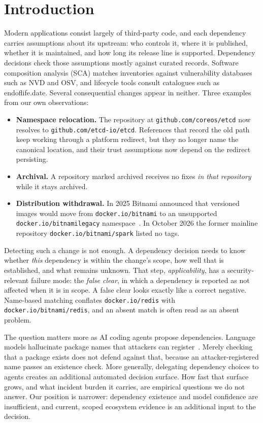 \documentclass[11pt,a4paper]{article}
\newcommand{\code}[1]{\texttt{#1}}
\begin{document}
\section{Introduction}
\label{sec:intro}

Modern applications consist largely of third-party code, and each
dependency carries assumptions about its upstream: who controls it,
where it is published, whether it is maintained, and how long its
release line is supported. Dependency decisions check those
assumptions mostly against curated records. Software composition
analysis (SCA) matches inventories against vulnerability databases
such as NVD and OSV, and lifecycle tools consult catalogues such as
endoflife.date. Several consequential changes appear in neither. Three
examples from our own observations:
\begin{itemize}[leftmargin=*]
  \item \textbf{Namespace relocation.} The repository at
    \code{github.com/coreos/etcd} now resolves to
    \code{github.com/etcd-io/etcd}. References that record the old
    path keep working through a platform redirect, but they no longer
    name the canonical location, and their trust assumptions now
    depend on the redirect persisting.
  \item \textbf{Archival.} A repository marked archived receives no
    fixes \emph{in that repository} while it stays archived.
  \item \textbf{Distribution withdrawal.} In 2025 Bitnami announced
    that versioned images would move from \code{docker.io/bitnami} to
    an unsupported \code{docker.io/bitnamilegacy}
    namespace~\cite{bitnami2025catalog}. In October 2026 the former
    mainline repository \code{docker.io/bitnami/spark} listed no tags.
\end{itemize}

Detecting such a change is not enough. A dependency decision needs to
know whether \emph{this} dependency is within the change's scope, how
well that is established, and what remains unknown. That step,
\emph{applicability}, has a security-relevant failure mode: the
\emph{false clear}, in which a dependency is reported as not affected
when it is in scope. A false clear looks exactly like a correct
negative. Name-based matching conflates \code{docker.io/redis} with
\code{docker.io/bitnami/redis}, and an absent match is often read as
an absent problem.

The question matters more as AI coding agents propose dependencies.
Language models hallucinate package names that attackers can
register~\cite{spracklen2025package}. Merely checking that a package
exists does not defend against that, because an attacker-registered
name passes an existence check. More generally, delegating dependency
choices to agents creates an additional automated decision surface.
How fast that surface grows, and what incident burden it carries, are
empirical questions we do not answer. Our position is narrower:
dependency existence and model confidence are insufficient, and
current, scoped ecosystem evidence is an additional input to the
decision.
\end{document}
